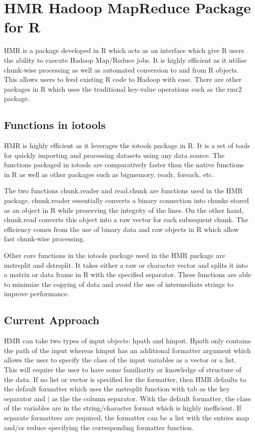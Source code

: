 \documentclass[11pt]{book}
\begin{document}
\chapter{HMR Hadoop MapReduce Package for R}

HMR is a package developed in R which acts as an interface which give R users the ability to execute Hadoop Map/Reduce jobs. It is highly efficient as it utilise chunk-wise processing as well as automated conversion to and from R objects. This allows users to feed existing R code to Hadoop with ease. There are other packages in R which uses the traditional key-value operations such as the rmr2 package.

\section{Functions in iotools}

HMR is highly efficient as it leverages the iotools package in R. It is a set of tools for quickly importing and processing datasets using any data source. The functions packaged in iotools are comparatively faster than the native functions in R as well as other packages such as bigmemory, readr, foreach, etc. 

The two functions chunk.reader and read.chunk are functions used in the HMR package. chunk.reader essentially converts a binary connection into chunks stored as an object in R while preserving the integrity of the lines. On the other hand, chunk.read converts this object into a raw vector for each subsequent chunk. The efficiency comes from the use of binary data and raw objects in R which allow fast chunk-wise processing. 

Other core functions in the iotools package used in the HMR package are mstrsplit and dstrsplit. It takes either a raw or character vector and splits it into a matrix or data frame in R with the specified separator. These functions are able to minimize the copying of data and avoid the use of intermediate strings to improve performance.


\section{Current Approach}

HMR can take two types of input objects: hpath and hinput. Hpath only contains the path of the input whereas hinput has an additional formatter argument which allows the user to specify the class of the input variables as a vector or a list. This will require the user to have some familiarity or knowledge of structure of the data. If no list or vector is specified for the formatter, then HMR defaults to the default formatter which uses the mstrsplit function with tab as the key separator and $\mid$ as the the column separator. With the default formatter, the class of the variables are in the string/character format which is highly inefficient. If separate formatters are required, the formatter can be a list with the entries map and/or reduce specifying the corresponding formatter function.
\end{document}
